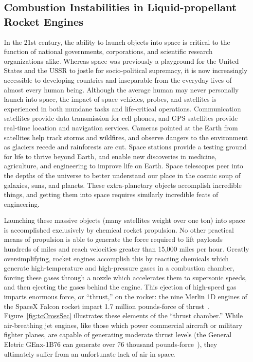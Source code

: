 \subsection{Combustion Instabilities in Liquid-propellant Rocket Engines}

In the 21st century, the ability to launch objects into space is critical to the function of national governments, corporations, and scientific research organizations alike. Whereas space was previously a playground for the United States and the USSR to jostle for socio-political supremacy, it is now increasingly accessible to developing countries and inseparable from the everyday lives of almost every human being. Although the average human may never personally launch into space, the impact of space vehicles, probes, and satellites is experienced in both mundane tasks and life-critical operations. Communication satellites provide data transmission for cell phones, and GPS satellites provide real-time location and navigation services. Cameras pointed at the Earth from satellites help track storms and wildfires, and observe dangers to the environment as glaciers recede and rainforests are cut. Space stations provide a testing ground for life to thrive beyond Earth, and enable new discoveries in medicine, agriculture, and engineering to improve life on Earth. Space telescopes peer into the depths of the universe to better understand our place in the cosmic soup of galaxies, suns, and planets. These extra-planetary objects accomplish incredible things, and getting them into space requires similarly incredible feats of engineering.

Launching these massive objects (many satellites weight over one ton) into space is accomplished exclusively by chemical rocket propulsion. No other practical means of propulsion is able to generate the force required to lift payloads hundreds of miles and reach velocities greater than 15,000 miles per hour. Greatly oversimplifying, rocket engines accomplish this by reacting chemicals which generate high-temperature and high-pressure gases in a combustion chamber, forcing these gases through a nozzle which accelerates them to supersonic speeds, and then ejecting the gases behind the engine. This ejection of high-speed gas imparts enormous force, or ``thrust,'' on the rocket: the nine Merlin 1D engines of the SpaceX Falcon rocket impart 1.7 million pounds-force of thrust~\cite{falconGuide}. Figure~\ref{fig:tcCrossSec} illustrates these elements of the ``thrust chamber.'' While air-breathing jet engines, like those which power commercial aircraft or military fighter planes, are capable of generating moderate thrust levels (the General Eletric GEnx-1B76 can generate over 76 thousand pounds-force~\cite{genxSpecs}), they ultimately suffer from an unfortunate lack of air in space.

